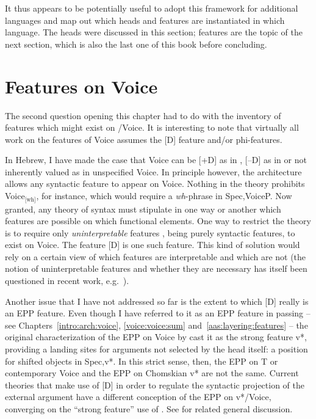 \begin{exe}
\begin{xlist}
\begin{xlist}
\begin{xlist}
\begin{xlist}
\begin{xlist}
\begin{xlist}
\begin{exe}
\begin{xlist}
\begin{exe}
\begin{exe}
\begin{xlist}
\begin{exe}
\begin{exe}
\begin{xlist}
\begin{exe}
\begin{xlist}
\begin{exe}
\begin{xlist}
\begin{exe}
\begin{xlist}
\begin{exe}
\begin{xlist}
It thus appears to be potentially useful to adopt this framework for additional languages and map out which heads and features are instantiated in which language. The heads were discussed in this section; features are the topic of the next section, which is also the last one of this book before concluding.


\section{Features on Voice} \label{i:agree}
The second question opening this chapter had to do with the inventory of features which might exist on \textit{}/Voice. It is interesting to note that virtually all work on the features of Voice assumes the [D] feature and/or phi-features.

In Hebrew, I have made the case that Voice can be [\!+\!D] as in {\vd}, [--D] as in {\vz} or not inherently valued as in unspecified Voice. In principle however, the architecture allows any syntactic feature to appear on Voice. Nothing in the theory prohibits Voice$_{\text{[wh]}}$, for instance, which would require a \emph{wh}-phrase in Spec,VoiceP. Now granted, any theory of syntax must stipulate in one way or another which features are possible on which functional elements. One way to restrict the theory is to require only \emph{uninterpretable} features \citep{chomsky95}, being purely syntactic features, to exist on Voice. The  feature [D] is one such feature. This kind of solution would rely on a certain view of which features are interpretable and which are not (the notion of uninterpretable features and whether they are necessary has itself been questioned in recent work, e.g.~\citealt{preminger14mit}).

\label{r1:g:2a2}Another issue that I have not addressed so far is the extent to which [D] really is an EPP feature. Even though I have referred to it as an EPP feature in passing -- see Chapters~\ref{intro:arch:voice}, \ref{voice:voice:sum} and~\ref{aas:layering:features} -- the original characterization of the EPP on Voice by \cite{chomsky00,chomsky01} cast it as the strong feature v*, providing a landing sites for arguments not selected by the head itself: a position for shifted objects in Spec,v*. In this strict sense, then, the EPP on T or contemporary Voice and the EPP on Chomskian v* are not the same. Current theories that make use of [D] in order to regulate the syntactic projection of the external argument have a different conception of the EPP on v*/Voice, converging on the ``strong feature'' use of \cite{adger03}. See \cite{adgersvenonius11} for related general discussion.


\end{xlist}
\end{exe}
\end{xlist}
\end{exe}
\end{xlist}
\end{exe}
\end{xlist}
\end{exe}
\end{xlist}
\end{exe}
\end{exe}
\end{xlist}
\end{exe}
\end{exe}
\end{xlist}
\end{exe}
\end{xlist}
\end{xlist}
\end{xlist}
\end{xlist}
\end{xlist}
\end{xlist}
\end{exe}
